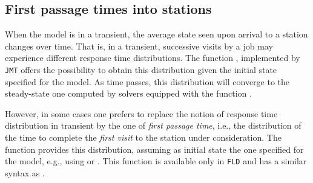\subsection{First passage times into stations}
When the model is in a transient, the average state seen upon arrival to a station changes over time. That is, in a transient, successive visits by a job may experience different response time distributions. The function , implemented by \texttt{JMT} offers the possibility to obtain this distribution given the initial state specified for the model. As time passes, this distribution will converge to the steady-state one computed by solvers equipped with the function .

However, in some cases one prefers to replace the notion of response time distribution in transient by the one of \emph{first passage time}, i.e., the distribution of the time to complete the {\em first visit} to the station under consideration. The function  provides this distribution, assuming as initial state the one specified for the model, e.g., using  or . This function is available only in \texttt{FLD} and has a similar syntax as .

